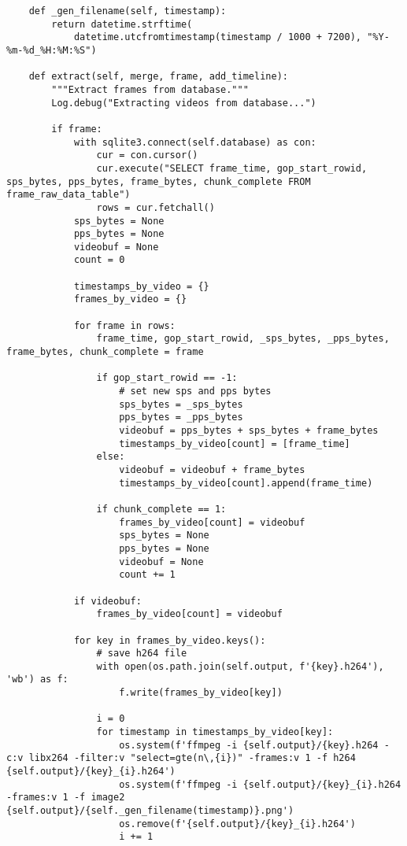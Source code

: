 \documentclass{easychair}
\begin{document}
\begin{enumerate}
\begin{lstlisting}
    def _gen_filename(self, timestamp):
        return datetime.strftime(
            datetime.utcfromtimestamp(timestamp / 1000 + 7200), "%Y-%m-%d_%H:%M:%S")

    def extract(self, merge, frame, add_timeline):
        """Extract frames from database."""
        Log.debug("Extracting videos from database...")

        if frame:
            with sqlite3.connect(self.database) as con:
                cur = con.cursor()
                cur.execute("SELECT frame_time, gop_start_rowid, sps_bytes, pps_bytes, frame_bytes, chunk_complete FROM frame_raw_data_table")
                rows = cur.fetchall()
            sps_bytes = None
            pps_bytes = None
            videobuf = None
            count = 0

            timestamps_by_video = {}
            frames_by_video = {}

            for frame in rows:
                frame_time, gop_start_rowid, _sps_bytes, _pps_bytes, frame_bytes, chunk_complete = frame

                if gop_start_rowid == -1:
                    # set new sps and pps bytes
                    sps_bytes = _sps_bytes
                    pps_bytes = _pps_bytes
                    videobuf = pps_bytes + sps_bytes + frame_bytes
                    timestamps_by_video[count] = [frame_time]
                else:
                    videobuf = videobuf + frame_bytes
                    timestamps_by_video[count].append(frame_time)

                if chunk_complete == 1:
                    frames_by_video[count] = videobuf
                    sps_bytes = None
                    pps_bytes = None
                    videobuf = None
                    count += 1

            if videobuf:
                frames_by_video[count] = videobuf

            for key in frames_by_video.keys():
                # save h264 file
                with open(os.path.join(self.output, f'{key}.h264'), 'wb') as f:
                    f.write(frames_by_video[key])

                i = 0
                for timestamp in timestamps_by_video[key]:
                    os.system(f'ffmpeg -i {self.output}/{key}.h264 -c:v libx264 -filter:v "select=gte(n\,{i})" -frames:v 1 -f h264 {self.output}/{key}_{i}.h264')
                    os.system(f'ffmpeg -i {self.output}/{key}_{i}.h264 -frames:v 1 -f image2 {self.output}/{self._gen_filename(timestamp)}.png')
                    os.remove(f'{self.output}/{key}_{i}.h264')
                    i += 1


\end{lstlisting}
\end{enumerate}
\end{document}
